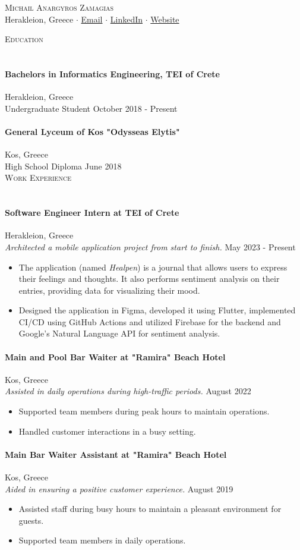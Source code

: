 \documentclass[a4paper, 11pt]{article}
\newcommand{\lineunder} {
	\vspace*{-8pt} \\
	\hspace*{-18pt} \hrulefill \\
}
\newcommand{\header} [1] {
	\vspace*{6mm}
	{\hspace*{-18pt}\vspace*{6pt} \textsc{#1}}
	\vspace*{-6pt} \lineunder
}
\newcommand{\education}[4]{ %
	\paragraph{#1} \hfill #3 \\ %
	#2 \hfill #4 \\ %
}
\newcommand{\workexperience}[5]{ %
	\paragraph{#1} \hfill #2 \\ %
	\textit{#3} \hfill #4 \\ %
	#5 %
}
\newcommand{\socialmediabutton}[2]{%
	\href{#1}{#2}
}
\begin{document}
\vspace*{-30pt}


\begin{center}
	{\Huge \scshape {Michail Anargyros Zamagias}}\\
	Herakleion, Greece $\cdot$ \socialmediabutton{mailto:contact@mikezamayias.com}{Email} $\cdot$ \socialmediabutton{https://linkedin.com/in/mikezamayias}{LinkedIn} $\cdot$ \socialmediabutton{https://mikezamayias.com}{Website}
\end{center}


\header{Education}
\education
{Bachelors in Informatics Engineering, TEI of Crete}
{Undergraduate Student}
{Herakleion, Greece}
{October 2018 -  Present}
\education
{General Lyceum of Kos "Odysseas Elytis"}
{High School Diploma}
{Kos, Greece}
{June 2018}


\header{Work Experience}
\workexperience
{Software Engineer Intern at TEI of Crete}
{Herakleion, Greece}
{Architected a mobile application project from start to finish.}
{May 2023 - Present}
{
	\begin{itemize} \itemsep 1pt
		\item The application (named \textit{Healpen}) is a journal that allows users to express their feelings and thoughts. It also performs sentiment analysis on their entries, providing data for visualizing their mood.
		\item Designed the application in Figma, developed it using Flutter, implemented CI/CD using GitHub Actions and utilized Firebase for the backend and Google's Natural Language API for sentiment analysis.
	\end{itemize}
}
\workexperience
{Main and Pool Bar Waiter at "Ramira" Beach Hotel}
{Kos, Greece}
{Assisted in daily operations during high-traffic periods.}
{August 2022}
{
	\begin{itemize} \itemsep 1pt
		\item Supported team members during peak hours to maintain operations.
		\item Handled customer interactions in a busy setting.
	\end{itemize}
}
\workexperience
{Main Bar Waiter Assistant at "Ramira" Beach Hotel}
{Kos, Greece}
{Aided in ensuring a positive customer experience.}
{August 2019}
{
	\begin{itemize} \itemsep 1pt
		\item Assisted staff during busy hours to maintain a pleasant environment for guests.
		\item Supported team members in daily operations.
	\end{itemize}
}
\end{document}
